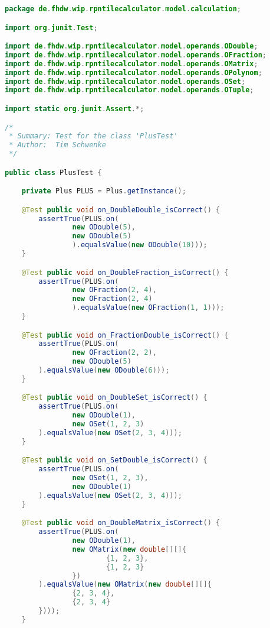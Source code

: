 \begin{lstlisting}[caption=PlusTest (Schwenke),label=list:PlusTest,language=Java]
package de.fhdw.wip.rpntilecalculator.model.calculation;

import org.junit.Test;

import de.fhdw.wip.rpntilecalculator.model.operands.ODouble;
import de.fhdw.wip.rpntilecalculator.model.operands.OFraction;
import de.fhdw.wip.rpntilecalculator.model.operands.OMatrix;
import de.fhdw.wip.rpntilecalculator.model.operands.OPolynom;
import de.fhdw.wip.rpntilecalculator.model.operands.OSet;
import de.fhdw.wip.rpntilecalculator.model.operands.OTuple;

import static org.junit.Assert.*;

/*
 * Summary: Test for the class 'PlusTest'
 * Author:  Tim Schwenke
 */

public class PlusTest {

    private Plus PLUS = Plus.getInstance();

    @Test public void on_DoubleDouble_isCorrect() {
        assertTrue(PLUS.on(
                new ODouble(5),
                new ODouble(5)
                ).equalsValue(new ODouble(10)));
    }

    @Test public void on_DoubleFraction_isCorrect() {
        assertTrue(PLUS.on(
                new OFraction(2, 4),
                new OFraction(2, 4)
                ).equalsValue(new OFraction(1, 1)));
    }

    @Test public void on_FractionDouble_isCorrect() {
        assertTrue(PLUS.on(
                new OFraction(2, 2),
                new ODouble(5)
        ).equalsValue(new ODouble(6)));
    }

    @Test public void on_DoubleSet_isCorrect() {
        assertTrue(PLUS.on(
                new ODouble(1),
                new OSet(1, 2, 3)
        ).equalsValue(new OSet(2, 3, 4)));
    }

    @Test public void on_SetDouble_isCorrect() {
        assertTrue(PLUS.on(
                new OSet(1, 2, 3),
                new ODouble(1)
        ).equalsValue(new OSet(2, 3, 4)));
    }

    @Test public void on_DoubleMatrix_isCorrect() {
        assertTrue(PLUS.on(
                new ODouble(1),
                new OMatrix(new double[][]{
                        {1, 2, 3},
                        {1, 2, 3}
                })
        ).equalsValue(new OMatrix(new double[][]{
                {2, 3, 4},
                {2, 3, 4}
        })));
    }


\end{lstlisting}
